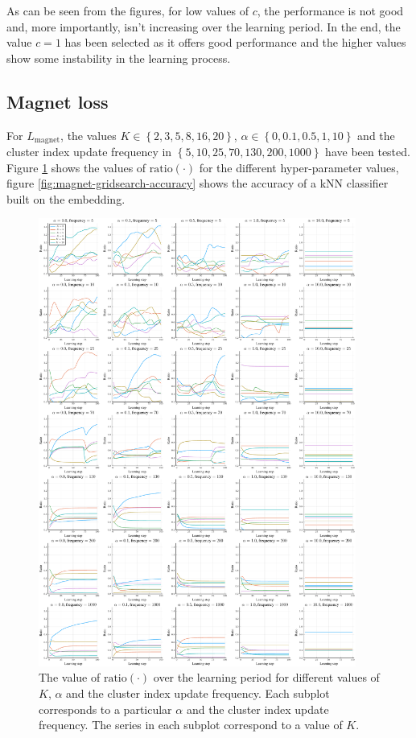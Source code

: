 As can be seen from the figures, for low values of \( c \), the performance is not good and, more importantly, isn't increasing over the learning period. In the end, the value \( c = 1 \) has been selected as it offers good performance and the higher values show some instability in the learning process.

\subsection{Magnet loss}
For \( L_\mathrm{magnet} \), the values \( K \in \left\{ 2, 3, 5, 8, 16, 20 \right\} \), \( \alpha \in \left\{ 0, 0.1, 0.5, 1, 10 \right\} \) and the cluster index update frequency in \( \left\{ 5, 10, 25, 70, 130, 200, 1000 \right\} \) have been tested. Figure \ref{fig:magnet-gridsearch-ratio} shows the values of \( \mathrm{ratio} \left( \cdot \right) \) for the different hyper-parameter values, figure \ref{fig:magnet-gridsearch-accuracy} shows the accuracy of a kNN classifier built on the embedding.

\begin{figure}[h]
  \centering
  \includegraphics[width=0.93\textwidth]{images/magnet-gridsearch/ratio/K/magnet-gridsearch-ratio-K.pdf}
  \caption{The value of \( \mathrm{ratio} \left( \cdot \right) \) over the learning period for different values of \( K \), \( \alpha \) and the cluster index update frequency. Each subplot corresponds to a particular \( \alpha \) and the cluster index update frequency. The series in each subplot correspond to a value of \( K \).}\label{fig:magnet-gridsearch-ratio}
\end{figure}

